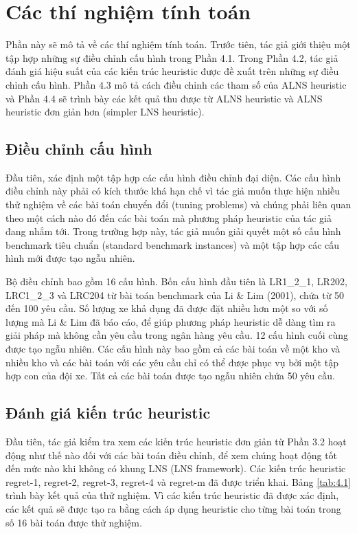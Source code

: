 \chapter{Các thí nghiệm tính toán}
Phần này sẽ mô tả về các thí nghiệm tính toán. Trước tiên, tác giả giới thiệu một tập hợp những sự điều chỉnh cấu hình trong Phần 4.1. Trong Phần 4.2, tác giả đánh giá hiệu suất của các kiến trúc heuristic được đề xuất trên những sự điều chỉnh cấu hình. Phần 4.3 mô tả cách điều chỉnh các tham số của ALNS heuristic và Phần 4.4 sẽ trình bày các kết quả thu được từ ALNS heuristic và ALNS heuristic đơn giản hơn (simpler LNS heuristic).

\section{Điều chỉnh cấu hình}
Đầu tiên, xác định một tập hợp các cấu hình điều chỉnh đại diện. Các cấu hình điều chỉnh này phải có kích thước khá hạn chế vì tác giả muốn thực hiện nhiều thử nghiệm về các bài toán chuyển đổi (tuning problems) và chúng phải liên quan theo một cách nào đó đến các bài toán mà phương pháp heuristic của tác giả đang nhắm tới. Trong trường hợp này, tác giả muốn giải quyết một số cấu hình benchmark tiêu chuẩn (standard benchmark instances) và một tập hợp các cấu hình mới được tạo ngẫu nhiên.

Bộ điều chỉnh bao gồm 16 cấu hình. Bốn cấu hình đầu tiên là LR1\_2\_1, LR202, LRC1\_2\_3 và LRC204 từ bài toán benchmark của Li \& Lim (2001), chứa từ 50 đến 100 yêu cầu. Số lượng xe khả dụng đã được đặt nhiều hơn một so với số lượng mà Li \& Lim đã báo cáo, để giúp phương pháp heuristic dễ dàng tìm ra giải pháp mà không cần yêu cầu trong ngân hàng yêu cầu. 12 cấu hình cuối cùng được tạo ngẫu nhiên. Các cấu hình này bao gồm cả các bài toán về một kho và nhiều kho và các bài toán với các yêu cầu chỉ có thể được phục vụ bởi một tập hợp con của đội xe. Tất cả các bài toán được tạo ngẫu nhiên chứa 50 yêu cầu.

\section{Đánh giá kiến trúc heuristic}
Đầu tiên, tác giả kiểm tra xem các kiến trúc heuristic đơn giản từ Phần 3.2 hoạt động như thế nào đối với các bài toán điều chỉnh, để xem chúng hoạt động tốt đến mức nào khi không có khung LNS (LNS framework). Các kiến trúc heuristic regret-1, regret-2, regret-3, regret-4 và regret-m đã được triển khai. Bảng \ref{tab:4.1} trình bày kết quả của thử nghiệm. Vì các kiến trúc heuristic đã được xác định, các kết quả sẽ được tạo ra bằng cách áp dụng heuristic cho từng bài toán trong số 16 bài toán được thử nghiệm.

